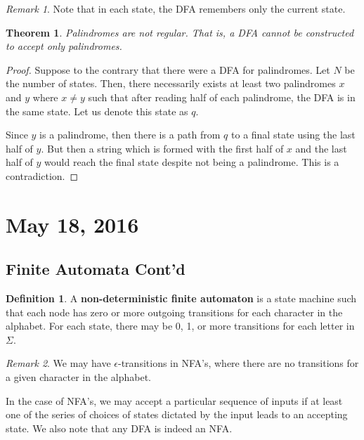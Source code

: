 \documentclass[11pt]{article}
\theoremstyle{plain} %
\newtheorem*{theorem}{Theorem}
\theoremstyle{definition}
\newtheorem*{definition}{Definition} %
\theoremstyle{example}
\theoremstyle{remark}
\newtheorem*{remark}{Remark}
\begin{document}
\begin{remark}
Note that in each state, the DFA remembers only the current state. 
\end{remark}




\begin{theorem}
Palindromes are not regular. That is, a DFA cannot be constructed to accept only palindromes.
\end{theorem}

\begin{proof}
Suppose to the contrary that there were a DFA for palindromes. Let $N$ be the number of states. Then, there necessarily exists at least two palindromes $x$ and $y$ where $x \neq y$ such that after reading half of each palindrome, the DFA is in the same state. Let us denote this state as $q$. 

Since $y$ is a palindrome, then there is a path from $q$ to a final state using the last half of $y$. But then a string which is formed with the first half of $x$ and the last half of $y$ would reach the final state despite not being a palindrome. This is a contradiction.
\end{proof}

\section{May 18, 2016}

\subsection{Finite Automata Cont'd}

\begin{definition}
A \textbf{non-deterministic finite automaton} is a state machine such that each node has zero or more outgoing transitions for each character in the alphabet. For each state, there may be 0, 1, or more transitions for each letter in $\Sigma$.
\end{definition}

\begin{remark}
We may have $\epsilon$-transitions in NFA's, where there are no transitions for a given character in the alphabet.
\end{remark}

In the case of NFA's, we may accept a particular sequence of inputs if at least one of the series of choices of states dictated by the input leads to an accepting state. We also note that any DFA is indeed an NFA.
\end{document}
